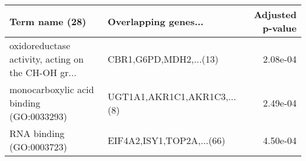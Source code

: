 \begin{tabular}{llr}
\toprule
                                    Term name (28) &        Overlapping genes... &  Adjusted p-value \\
\midrule
oxidoreductase activity, acting on the CH-OH gr... &      CBR1,G6PD,MDH2,...(13) &          2.08e-04 \\
          monocarboxylic acid binding (GO:0033293) & UGT1A1,AKR1C1,AKR1C3,...(8) &          2.49e-04 \\
                          RNA binding (GO:0003723) &   EIF4A2,ISY1,TOP2A,...(66) &          4.50e-04 \\
\bottomrule
\end{tabular}
